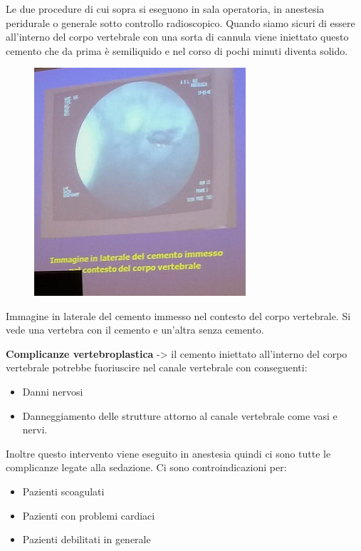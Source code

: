 Le due procedure di cui sopra si eseguono in sala operatoria, in anestesia peridurale o generale sotto controllo radioscopico. Quando siamo sicuri di essere all'interno del corpo vertebrale con una sorta di
cannula viene iniettato questo cemento che da prima è semiliquido e nel corso di pochi minuti diventa solido.

\begin{figure}[!ht]
\centering
\includegraphics[width=0.7\textwidth]{003/image6.jpeg}
\end{figure}

Immagine in laterale del cemento immesso nel contesto del corpo vertebrale. Si vede una vertebra con il cemento e un'altra senza cemento.

\textbf{Complicanze vertebroplastica} -> il cemento iniettato all'interno
del corpo vertebrale potrebbe fuoriuscire nel canale vertebrale con
conseguenti:

\begin{itemize}
\item
  Danni nervosi
\item
  Danneggiamento delle strutture attorno al canale vertebrale come vasi e nervi.
\end{itemize}

Inoltre questo intervento viene eseguito in anestesia quindi ci sono tutte le complicanze legate alla sedazione. Ci sono controindicazioni per:

\begin{itemize}
\item
  Pazienti scoagulati
\item
  Pazienti con problemi cardiaci
\item
  Pazienti debilitati in generale
\end{itemize}

